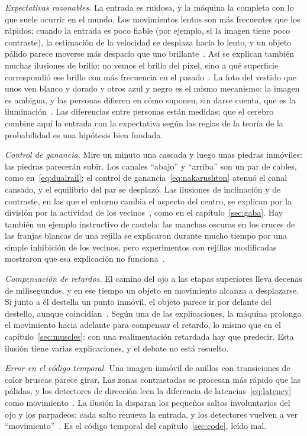 \emph{Expectativas razonables.} La entrada es ruidosa, y la máquina la completa con lo que suele ocurrir en el mundo. Los movimientos lentos son más frecuentes que los rápidos; cuando la entrada es poco fiable (por ejemplo, si la imagen tiene poco contraste), la estimación de la velocidad se desplaza hacia lo lento, y un objeto pálido parece moverse más despacio que uno brillante~\cite{Weiss2002}. Así se explican también muchas ilusiones de brillo: no vemos el brillo del píxel, sino a qué superficie correspondió ese brillo con más frecuencia en el pasado~\cite{Purves2011}. La foto del vestido que unos ven blanco y dorado y otros azul y negro es el mismo mecanismo: la imagen es ambigua, y las personas difieren en cómo suponen, sin darse cuenta, que es la iluminación~\cite{LaferSousa2015,Wallisch2017}. Las diferencias entre personas están medidas; que el cerebro combine aquí la entrada con la expectativa según las reglas de la teoría de la probabilidad es una hipótesis bien fundada.

\emph{Control de ganancia.} Mire un minuto una cascada y luego unas piedras inmóviles: las piedras parecerán subir. Los canales “abajo” y “arriba” son un par de cables, como en~\eqref{eq:dualrail}; el control de ganancia~\eqref{eq:nakarushton} atenuó el canal cansado, y el equilibrio del par se desplazó. Las ilusiones de inclinación y de contraste, en las que el entorno cambia el aspecto del centro, se explican por la división por la actividad de los vecinos~\cite{Schwartz2009}, como en el capítulo~\ref{sec:gaba}. Hay también un ejemplo instructivo de cautela: las manchas oscuras en los cruces de las franjas blancas de una rejilla se explicaron durante mucho tiempo por una simple inhibición de los vecinos, pero experimentos con rejillas modificadas mostraron que esa explicación no funciona~\cite{SchillerCarvey2005}.

\emph{Compensación de retardos.} El camino del ojo a las etapas superiores lleva decenas de milisegundos, y en ese tiempo un objeto en movimiento alcanza a desplazarse. Si junto a él destella un punto inmóvil, el objeto parece ir por delante del destello, aunque coincidían~\cite{Nijhawan1994}. Según una de las explicaciones, la máquina prolonga el movimiento hacia adelante para compensar el retardo, lo mismo que en el capítulo~\ref{sec:muscles}: con una realimentación retardada hay que predecir. Esta ilusión tiene varias explicaciones, y el debate no está resuelto.

\emph{Error en el código temporal.} Una imagen inmóvil de anillos con transiciones de color bruscas parece girar. Las zonas contrastadas se procesan más rápido que las pálidas, y los detectores de dirección leen la diferencia de latencias~\eqref{eq:latency} como movimiento~\cite{Conway2005}. La ilusión la disparan los pequeños saltos involuntarios del ojo y los parpadeos: cada salto renueva la entrada, y los detectores vuelven a ver “movimiento”~\cite{OteroMillan2012}. Es el código temporal del capítulo~\ref{sec:code}, leído mal.

